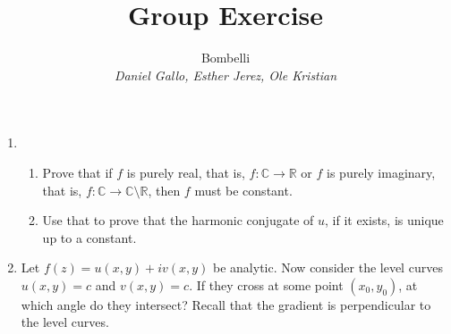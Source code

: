 \documentclass{article}
\title{Group Exercise}
\author{
    Bombelli \\
    \textit{Daniel Gallo, Esther Jerez, Ole Kristian}
}
\def\C{\mathbb{C}}
\def\R{\mathbb{R}}
\begin{document}
    \maketitle

    \begin{enumerate}
        \item 
            \begin{enumerate}
                \item Prove that if $f$ is purely real, that is, $f \colon \C \to \R$ or $f$ is purely imaginary, that is, $f \colon \C \to \C \setminus \R$, then $f$ must be constant.
                \item Use that to prove that the harmonic conjugate of $u$, if it exists, is unique up to a constant.
            \end{enumerate}
        \item Let $f(z) = u(x, y) + iv(x, y)$ be analytic. Now consider the level curves $u(x, y) = c$ and $v(x, y) = c$. If they cross at some point $(x_0, y_0)$, at which angle do they intersect? Recall that the gradient is perpendicular to the level curves.
    \end{enumerate}
\end{document}
